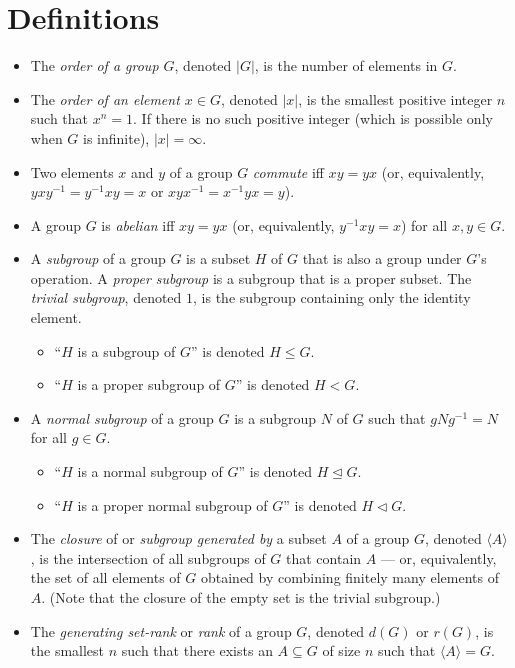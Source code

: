 \documentclass{article}
\newcommand{\gen}[1]{\langle #1\rangle}
\newcommand{\normaleq}{\trianglelefteq}
\newcommand{\normal}{\triangleleft}
\begin{document}
\section{Definitions}
\begin{itemize}
\item The \emph{order of a group $G$}, denoted $|G|$, is the number of elements in $G$.  %
\item The \emph{order of an element $x\in G$}, denoted $|x|$, is the smallest positive integer $n$ such that $x^n = 1$.  If there is no such positive integer (which is possible only when $G$ is infinite), $|x| = \infty$.
\item Two elements $x$ and $y$ of a group $G$ \emph{commute} iff $xy = yx$ (or, equivalently, $yxy^{-1} = y^{-1}xy = x$ or $xyx^{-1} = x^{-1}yx = y$).
\item A group $G$ is \emph{abelian} iff $xy = yx$ (or, equivalently, $y^{-1}xy = x$) for all $x,y\in G$.

\item A \emph{subgroup} of a group $G$ is a subset $H$ of $G$ that is also a group under $G$'s operation.  A \emph{proper subgroup} is a subgroup that is a proper subset.  The \emph{trivial subgroup}, denoted $1$, is the subgroup containing only the identity element.
 \begin{itemize}
 \item ``$H$ is a subgroup of $G$'' is denoted $H\leq G$.
 \item ``$H$ is a proper subgroup of $G$'' is denoted $H<G$.
 \end{itemize}
\item A \emph{normal subgroup} of a group $G$ is a subgroup $N$ of $G$ such that $gNg^{-1} = N$ for all $g\in G$.
 \begin{itemize}
 \item ``$H$ is a normal subgroup of $G$'' is denoted $H\normaleq G$.
 \item ``$H$ is a proper normal subgroup of $G$'' is denoted $H\normal G$.
 \end{itemize}
\item The \emph{closure} of or \emph{subgroup generated by} a subset $A$ of a group $G$, denoted $\gen{A}$, is the intersection of all subgroups of $G$ that contain $A$ --- or, equivalently, the set of all elements of $G$ obtained by combining finitely many elements of $A$.  (Note that the closure of the empty set is the trivial subgroup.)
\item The \emph{generating set-rank} or \emph{rank} of a group $G$, denoted $d(G)$ or $r(G)$, is the smallest $n$ such that there exists an $A\subseteq G$ of size $n$ such that $\gen{A} = G$.


\end{itemize}
\end{document}
